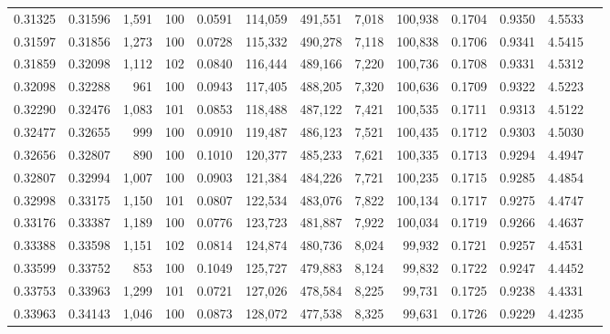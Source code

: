 \begin{tabular}{rrrrrrrrrrrrr}
0.31325 & 0.31596 & 1,591 & 100 &                                     0.0591 & 114,059 & 491,551 &   7,018 & 100,938 & 0.1704 & 0.9350 & 4.5533 \\
0.31597 & 0.31856 & 1,273 & 100 &                                     0.0728 & 115,332 & 490,278 &   7,118 & 100,838 & 0.1706 & 0.9341 & 4.5415 \\
0.31859 & 0.32098 & 1,112 & 102 &                                     0.0840 & 116,444 & 489,166 &   7,220 & 100,736 & 0.1708 & 0.9331 & 4.5312 \\
0.32098 & 0.32288 &   961 & 100 &                                     0.0943 & 117,405 & 488,205 &   7,320 & 100,636 & 0.1709 & 0.9322 & 4.5223 \\
0.32290 & 0.32476 & 1,083 & 101 &                                     0.0853 & 118,488 & 487,122 &   7,421 & 100,535 & 0.1711 & 0.9313 & 4.5122 \\
0.32477 & 0.32655 &   999 & 100 &                                     0.0910 & 119,487 & 486,123 &   7,521 & 100,435 & 0.1712 & 0.9303 & 4.5030 \\
0.32656 & 0.32807 &   890 & 100 &                                     0.1010 & 120,377 & 485,233 &   7,621 & 100,335 & 0.1713 & 0.9294 & 4.4947 \\
0.32807 & 0.32994 & 1,007 & 100 &                                     0.0903 & 121,384 & 484,226 &   7,721 & 100,235 & 0.1715 & 0.9285 & 4.4854 \\
0.32998 & 0.33175 & 1,150 & 101 &                                     0.0807 & 122,534 & 483,076 &   7,822 & 100,134 & 0.1717 & 0.9275 & 4.4747 \\
0.33176 & 0.33387 & 1,189 & 100 &                                     0.0776 & 123,723 & 481,887 &   7,922 & 100,034 & 0.1719 & 0.9266 & 4.4637 \\
0.33388 & 0.33598 & 1,151 & 102 &                                     0.0814 & 124,874 & 480,736 &   8,024 &  99,932 & 0.1721 & 0.9257 & 4.4531 \\
0.33599 & 0.33752 &   853 & 100 &                                     0.1049 & 125,727 & 479,883 &   8,124 &  99,832 & 0.1722 & 0.9247 & 4.4452 \\
0.33753 & 0.33963 & 1,299 & 101 &                                     0.0721 & 127,026 & 478,584 &   8,225 &  99,731 & 0.1725 & 0.9238 & 4.4331 \\
0.33963 & 0.34143 & 1,046 & 100 &                                     0.0873 & 128,072 & 477,538 &   8,325 &  99,631 & 0.1726 & 0.9229 & 4.4235 \\

\end{tabular}
